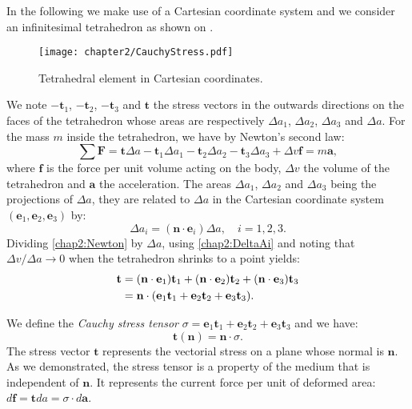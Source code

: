\ON In the following we make use of a Cartesian coordinate system and we consider an infinitesimal tetrahedron as shown on . \OFF
%
\begin{figure}[ht]
\begin{center}
\texttt{[image: chapter2/CauchyStress.pdf]}
\end{center}
\caption{Tetrahedral element in Cartesian coordinates.}
\label{chap2:fig-CauchyStress}
\end{figure}
%
We note $-\mathbf{t}_1$, $-\mathbf{t}_2$, $-\mathbf{t}_3$ and $\mathbf{t}$ the stress vectors in the outwards directions on the faces of the tetrahedron whose areas are respectively $\Delta a_1$, $\Delta a_2$, $\Delta a_3$ and $\Delta a$. For the mass $m$ inside the tetrahedron, we have by Newton's second law:
\begin{equation}
\label{chap2:Newton}
\sum \mathbf{F} = \mathbf{t} \Delta a - \mathbf{t}_1 \Delta a_1 - \mathbf{t}_2 \Delta a_2 - \mathbf{t}_3 \Delta a_3 + \Delta v \mathbf{f} = m \mathbf{a},
\end{equation}
where $\mathbf{f}$ is the force per unit volume acting on the body, $\Delta v$ the volume of the tetrahedron and $\mathbf{a}$ the acceleration.
The areas $\Delta a_1$, $\Delta a_2$ and $\Delta a_3$ being the projections of $\Delta a$, they are related to $\Delta a$ in the Cartesian coordinate system $(\mathbf{e}_1, \mathbf{e}_2, \mathbf{e}_3)$ by:
\begin{equation}
\label{chap2:DeltaAi}
\Delta a_i = (\mathbf{n} \cdot \mathbf{e}_i) \Delta a, \quad i=1, 2, 3.
\end{equation}
Dividing \eqref{chap2:Newton} by $\Delta a$, using \eqref{chap2:DeltaAi} and noting that $\Delta v \slash \Delta a \rightarrow 0$ when the tetrahedron shrinks to a point yields:
\begin{align}
\mathbf{t} &= (\mathbf{n} \cdot \mathbf{e}_1) \mathbf{t}_1 + (\mathbf{n} \cdot \mathbf{e}_2) \mathbf{t}_2 + (\mathbf{n} \cdot \mathbf{e}_3) \mathbf{t}_3 \notag \\
&= \mathbf{n} \cdot (\mathbf{e}_1 \mathbf{t}_1 + \mathbf{e}_2 \mathbf{t}_2 + \mathbf{e}_3 \mathbf{t}_3).
\end{align}

We define the \emph{Cauchy stress tensor} $\sigma = \mathbf{e}_1 \mathbf{t}_1 + \mathbf{e}_2 \mathbf{t}_2 + \mathbf{e}_3 \mathbf{t}_3$ and we have:
\begin{equation}
\label{chap2:CauchyFormula}
\mathbf{t}(\mathbf{n}) = \mathbf{n} \cdot \sigma .
\end{equation}
The stress vector $\mathbf{t}$ represents the vectorial stress on a plane whose normal is $\mathbf{n}$. As we demonstrated, the stress tensor is a property of the medium that is independent of $\mathbf{n}$. It represents the current force per unit of deformed area: $d\mathbf{f} = \mathbf{t} da = \sigma \cdot d\mathbf{a}$. 


